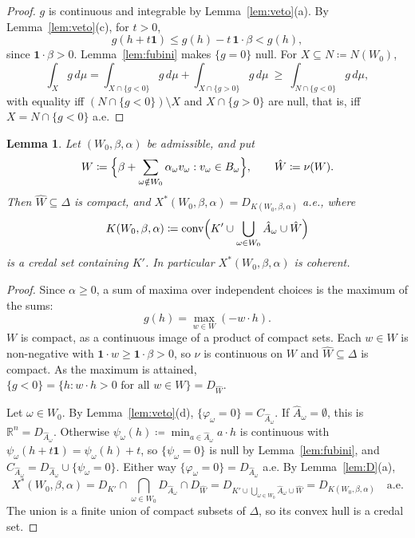 \documentclass[11pt]{article}
\newcommand{\R}{\mathbb{R}}
\newcommand{\one}{\mathbf{1}}
\DeclareMathOperator{\conv}{conv}
\theoremstyle{plain}
\newtheorem{lemma}[theorem]{Lemma}
\theoremstyle{definition}
\theoremstyle{remark}
\begin{document}
\begin{proof}
$g$ is continuous and integrable by Lemma~\ref{lem:veto}(a). By Lemma~\ref{lem:veto}(c),
for $t>0$,
\[
  g(h+t\one)\le g(h)-t\,\one\cdot\beta<g(h),
\]
since $\one\cdot\beta>0$. Lemma~\ref{lem:fubini} makes $\{g=0\}$ null. For $X\subseteq
N\coloneqq N(W_0)$,
\[
  \int_Xg\,d\mu=\int_{X\cap\{g<0\}}g\,d\mu+\int_{X\cap\{g>0\}}g\,d\mu\ \ge\
  \int_{N\cap\{g<0\}}g\,d\mu,
\]
with equality iff $(N\cap\{g<0\})\setminus X$ and $X\cap\{g>0\}$ are null, that is, iff
$X=N\cap\{g<0\}$ a.e.
\end{proof}

\begin{lemma}\label{lem:coh}
Let $(W_0,\beta,\alpha)$ be admissible, and put
\[
  W\coloneqq\Bigl\{\beta+\sum_{\omega\notin W_0}\alpha_\omega v_\omega:v_\omega\in
  B_\omega\Bigr\},\qquad\hat W\coloneqq\nu(W).
\]
Then $\hat W\subseteq\Delta$ is compact, and $X^\ast(W_0,\beta,\alpha)=D_{K(W_0,\beta,
\alpha)}$ a.e., where
\[
  K(W_0,\beta,\alpha)\coloneqq\conv\Bigl(K'\cup\bigcup_{\omega\in W_0}\hat A_\omega\cup
  \hat W\Bigr)
\]
is a credal set containing $K'$. In particular $X^\ast(W_0,\beta,\alpha)$ is coherent.
\end{lemma}

\begin{proof}
Since $\alpha\ge0$, a sum of maxima over independent choices is the maximum of the sums:
\[
  g(h)=\max_{w\in W}(-w\cdot h).
\]
$W$ is compact, as a continuous image of a product of compact sets. Each $w\in W$ is
non-negative with $\one\cdot w\ge\one\cdot\beta>0$, so $\nu$ is continuous on $W$ and
$\hat W\subseteq\Delta$ is compact. As the maximum is attained, $\{g<0\}=\{h:w\cdot h>0
\text{ for all }w\in W\}=D_{\hat W}$.

Let $\omega\in W_0$. By Lemma~\ref{lem:veto}(d), $\{\varphi_\omega=0\}=C_{\hat
A_\omega}$. If $\hat A_\omega=\emptyset$, this is $\R^n=D_{\hat A_\omega}$. Otherwise
$\psi_\omega(h)\coloneqq\min_{a\in\hat A_\omega}a\cdot h$ is continuous with
$\psi_\omega(h+t\one)=\psi_\omega(h)+t$, so $\{\psi_\omega=0\}$ is null by
Lemma~\ref{lem:fubini}, and $C_{\hat A_\omega}=D_{\hat A_\omega}\cup\{\psi_\omega=0\}$.
Either way $\{\varphi_\omega=0\}=D_{\hat A_\omega}$ a.e. By Lemma~\ref{lem:D}(a),
\[
  X^\ast(W_0,\beta,\alpha)=D_{K'}\cap\bigcap_{\omega\in W_0}D_{\hat A_\omega}\cap
  D_{\hat W}=D_{K'\cup\bigcup_{\omega\in W_0}\hat A_\omega\cup\hat W}=
  D_{K(W_0,\beta,\alpha)}\quad\text{a.e.}
\]
The union is a finite union of compact subsets of $\Delta$, so its convex hull is a
credal set.
\end{proof}
\end{document}
